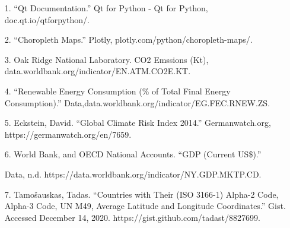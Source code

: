 \documentclass[fontsize=11pt]{article}
\begin{document}
    \begin{enumerate}
    	\item[1.] “Qt Documentation.” Qt for Python - Qt for Python, doc.qt.io/qtforpython/.

    	 \item[2.] “Choropleth Maps.” Plotly, plotly.com/python/choropleth-maps/.

    	 \item[3.] Oak Ridge National Laboratory. CO2 Emssions (Kt), data.worldbank.org/indicator/EN.ATM.CO2E.KT.

    	 \item[4.] “Renewable Energy Consumption
    	 (\% of Total Final Energy Consumption).” Data,\newline data.worldbank.org/indicator/EG.FEC.RNEW.ZS.

    	 \item[5.] Eckstein, David. “Global Climate Risk Index 2014.” Germanwatch.org, https://germanwatch.org/en/7659.

    	 \item[6.] World Bank, and OECD National Accounts. “GDP (Current US\$).”

    	  Data, n.d. https://data.worldbank.org/indicator/NY.GDP.MKTP.CD.

    	 \item[7.] Tamošauskas, Tadas. “Countries with Their (ISO 3166-1) Alpha-2 Code, Alpha-3 Code, UN M49, Average Latitude and Longitude Coordinates.” Gist. Accessed December 14, 2020. https://gist.github.com/tadast/8827699.
    \end{enumerate}
\end{document}
